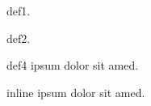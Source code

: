 \begin{center}
    \Huge {}
\end{center}
\label{art:agreement}
\begin{paras}
    \item \label{lid:lorem} \textfill~\Gls{def1}.
    \item \label{lid:lorem2} \textfill~\Gls{def2}.
    \item \label{lid:lorem3} \label{lid:met spatie} \textfill
    \item \label{lid:lorem4} \textfill
    \item \label{lid:lorem5} \textfill~\Gls{def4} ipsum dolor sit amed.
    \item \label{lid:inline} \textfill~\Gls{inline} ipsum dolor sit amed.\\
    \begin{paras}
        \item \label{sub:lorem} \textfill
        \item \label{sub:lorem2} \textfill
        \item \label{sub:lorem3} \textfill
        \item \label{sub:lorem4} \textfill
    \end{paras}
\end{paras}
\textfill